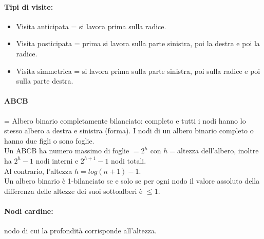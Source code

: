 \documentclass[a4paper,12pt]{article}
\begin{document}
\paragraph{Tipi di visite:}
\begin{itemize}
  \item Visita anticipata = si lavora prima sulla radice.
  \item Visita posticipata = prima si lavora sulla parte sinistra, poi la destra e poi la radice.
  \item Visita simmetrica = si lavora prima sulla parte sinistra, poi sulla radice e poi sulla parte destra.
\end{itemize}
\paragraph{ABCB} = Albero binario completamente bilanciato: completo e tutti i nodi hanno lo stesso albero a destra e sinistra (forma). I nodi di un albero binario completo o hanno due figli o sono foglie.\\
Un ABCB ha numero massimo di foglie $= 2^h$ con $h = $altezza dell'albero, inoltre ha $2^h -1$ nodi interni e $2^{h+1} - 1$ nodi totali.\\
Al contrario, l'altezza $h = log(n+1) - 1$.\\
Un albero binario è 1-bilanciato se e solo se per ogni nodo il valore assoluto della differenza delle altezze dei suoi sottoalberi è $\leq 1$.
\paragraph{Nodi cardine:} nodo di cui la profondità corrisponde all'altezza.
\end{document}
